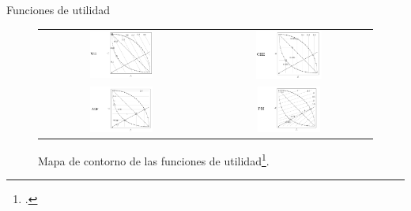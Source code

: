 \documentclass{beamer}
\begin{document}
\begin{frame}{Funciones de utilidad}
\begin{figure}[H]
\begin{tabular}{c c}
\includegraphics[width=0.4\textwidth]{Images/ws.png}     &  \includegraphics[width=0.42\textwidth]{Images/che.png} \\
\includegraphics[width=0.4\textwidth]{Images/asf.png}     &  \includegraphics[width=0.4\textwidth]{Images/pbi.png} \\
\end{tabular}
\centering
\caption{\scriptsize Mapa de contorno de las funciones de utilidad\footcite{raquel_2018}.}
\end{figure}
\end{frame}
\end{document}
